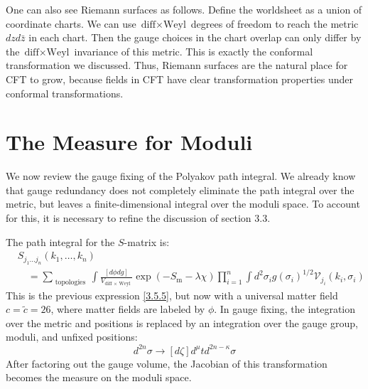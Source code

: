 One can also see Riemann surfaces as follows. Define the worldsheet as a union of coordinate charts. We can use $\text{diff} \times \text{Weyl}$ degrees of freedom to reach the metric $d z d \bar{z}$ in each chart. Then the gauge choices in the chart overlap can only differ by the $\text{diff} \times \text{Weyl}$ invariance of this metric. This is exactly the conformal transformation we discussed. Thus, Riemann surfaces are the natural place for CFT to grow, because fields in CFT have clear transformation properties under conformal transformations.

\section{The Measure for Moduli}\label{sec:5.3}
We now review the gauge fixing of the Polyakov path integral. We already know that gauge redundancy does not completely eliminate the path integral over the metric, but leaves a finite-dimensional integral over the moduli space. To account for this, it is necessary to refine the discussion of section 3.3.

The path integral for the $S$-matrix is:
\begin{equation}
	\begin{aligned}
		&S_{j_{1} \ldots j_{n}}\left(k_{1}, \ldots, k_{n}\right) \\
		&\quad=\sum_{\text { topologies }} \int \frac{[d \phi d g]}{V_{\text {diff } \times \text { Weyl }}} \exp \left(-S_{\mathrm{m}}-\lambda \chi\right) \prod_{i=1}^{n} \int d^{2} \sigma_{i} g\left(\sigma_{i}\right)^{1 / 2} \mathscr{V}_{j_{i}}\left(k_{i}, \sigma_{i}\right)
	\end{aligned}\label{5.3.1}
\end{equation}
This is the previous expression \eqref{3.5.5}, but now with a universal matter field $c=\tilde{c}=26$, where matter fields are labeled by $\phi$. In gauge fixing, the integration over the metric and positions is replaced by an integration over the gauge group, moduli, and unfixed positions:
\begin{equation}
	[d g] d^{2 n} \sigma \rightarrow[d \zeta] d^{\mu} t d^{2 n-\kappa} \sigma\label{5.3.2}
\end{equation}
After factoring out the gauge volume, the Jacobian of this transformation becomes the measure on the moduli space.

